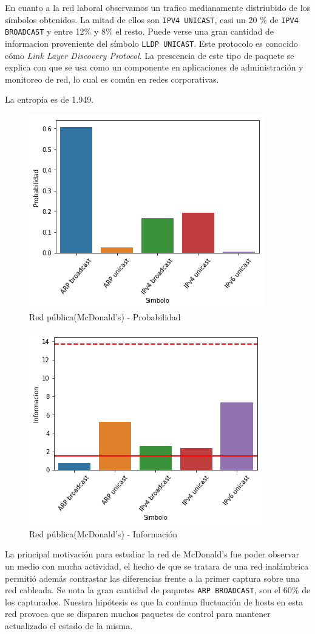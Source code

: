 En cuanto a la red laboral observamos un trafico medianamente distriubido de los símbolos obtenidos. La mitad de ellos son \texttt{IPV4 UNICAST}, casi un 20 \% de \texttt{IPV4 BROADCAST} y entre 12\% y 8\% el resto. Puede verse una gran cantidad de informacion proveniente del símbolo \texttt{LLDP UNICAST}. Este protocolo es conocido cómo \textit{Link Layer Discovery Protocol}. La prescencia de este tipo de paquete se explica con que se usa como un componente en aplicaciones de administración y monitoreo de red, lo cual es común en redes corporativas.

La entropía es de 1.949. 

\begin{figure}[H]
	\centering
	\includegraphics[width=.5\linewidth]{imagenes/mac_barras_prob}
	\caption{Red pública(McDonald's) - Probabilidad}
\end{figure}

\begin{figure}[H]
	\centering
	\includegraphics[width=.5\linewidth]{imagenes/mac_barras_info}
	\caption{Red pública(McDonald's) - Información}
\end{figure}

La principal motivación para estudiar la red de McDonald's fue poder observar un medio con mucha actividad, el hecho de que se tratara de una red inalámbrica permitió además contrastar las diferencias frente a la primer captura sobre una red cableada. Se nota la gran cantidad de paquetes \texttt{ARP BROADCAST}, son el 60\% de los capturados. Nuestra hipótesis es que la continua fluctuación de hosts en esta red provoca que se disparen muchos paquetes de control para mantener actualizado el estado de la misma.

